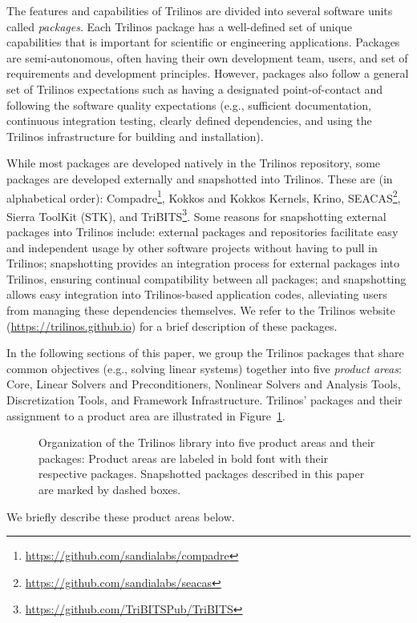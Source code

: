 
The features and capabilities of Trilinos are divided into several software units called \textit{packages}.
Each Trilinos package has a well-defined set of unique capabilities that is important for scientific or engineering applications. Packages are semi-autonomous, often having their own development team, users, and set of requirements and development principles.  However, packages also follow a general set of Trilinos expectations such as having a designated point-of-contact and following the software quality expectations (e.g., sufficient documentation, continuous integration testing, clearly defined dependencies, and using the Trilinos infrastructure for building and installation).

While most packages are developed natively in the Trilinos repository, some packages are developed externally and snapshotted into Trilinos.
These are (in alphabetical order):
Compadre\footnote{\url{https://github.com/sandialabs/compadre}},
Kokkos and Kokkos Kernels,
Krino,
SEACAS\footnote{\url{https://github.com/sandialabs/seacas}},
Sierra ToolKit (STK),
and TriBITS\footnote{\url{https://github.com/TriBITSPub/TriBITS}}.
Some reasons for snapshotting external packages into Trilinos include:
external packages and repositories facilitate easy and independent usage by other software projects without having to pull in Trilinos;
snapshotting provides an integration process for external packages into Trilinos, ensuring continual compatibility between all packages;
and snapshotting allows easy integration into Trilinos-based application codes, alleviating users from managing these dependencies themselves.
We refer to the Trilinos website (\url{https://trilinos.github.io}) for a brief description of these packages.

In the following sections of this paper, we group the Trilinos packages that share common objectives (e.g., solving linear systems) together into five \textit{product areas}:  Core, Linear Solvers and Preconditioners, Nonlinear Solvers and Analysis Tools, Discretization Tools, and Framework Infrastructure.
Trilinos' packages and their assignment to a product area are illustrated in Figure~\ref{fig:GraphicalOverview}.
\begin{figure}
\centering

\caption{Organization of the Trilinos library into five product areas and their packages: Product areas are labeled in bold font with their respective packages.
Snapshotted packages described in this paper are marked by dashed boxes.}
\label{fig:GraphicalOverview}
\end{figure}
We briefly describe these product areas below.

